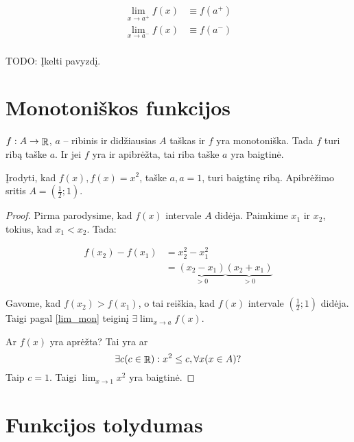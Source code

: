 \begin{notation}
  \begin{align*}
    \lim _{x \to a^{+}} f(x) &\equiv f(a^{+}) \\
    \lim _{x \to a^{-}} f(x) &\equiv f(a^{-}) \\
  \end{align*}
\end{notation}

TODO: Įkelti pavyzdį.

\section{Monotoniškos funkcijos}

\begin{prop}
  \label{lim_mon}
  $f: A \to \mathop{\mathbb{R}}$, $a$ – ribinis ir didžiausias $A$ taškas ir $f$ yra
  monotoniška. Tada $f$ turi ribą taške $a$. Ir jei $f$ yra ir apibrėžta,
  tai riba taške $a$ yra baigtinė.
\end{prop}

\begin{exmp}
  Įrodyti, kad $f(x), f(x) = x^2$, taške $a, a = 1$, turi baigtinę ribą.
  Apibrėžimo sritis $A = \left( \frac{1}{2}; 1 \right)$.

  \begin{proof}
    Pirma parodysime, kad $f(x)$ intervale $A$ didėja. Paimkime 
    $x_{1}$ ir $x_{2}$, tokius, kad $x_{1} < x_{2}$. Tada:

    \begin{align*}
      f(x_{2}) - f(x_{1}) 
      &= x _{2} ^{2} - x _{1} ^{2} \\
      &= \underbrace{(x_{2} - x_{1})}_{> 0}
        \underbrace{(x_{2} + x_{1})}_{> 0}
    \end{align*}

    Gavome, kad $f(x_{2}) > f(x_{1})$, o tai reiškia, kad $f(x)$ intervale
    $\left( \frac{1}{2} ; 1 \right)$ didėja. Taigi pagal \ref{lim_mon}
    teiginį $\exists \lim _{x \to a} f(x)$.

    Ar $f(x)$ yra aprėžta? Tai yra ar
    \begin{equation*}
      \exists c (c \in \mathop{\mathbb{R}}) : x^{2} \leq c, \forall x (x \in A)?
    \end{equation*}
    Taip $c = 1$. Taigi $\lim _{x \to 1} x^{2}$ yra baigtinė.
  \end{proof}
\end{exmp}

\section{Funkcijos tolydumas}

